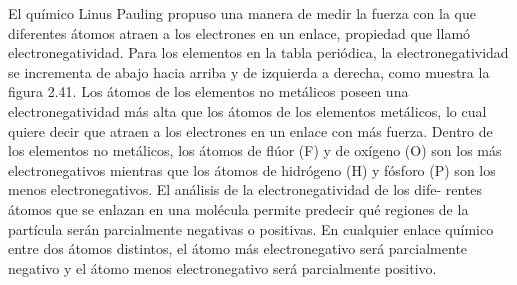\documentclass[12pt,addpoints,answers]{guia}
\begin{document}
\begin{tcolorbox}[enhanced,attach boxed title to top center={yshift=-3mm,yshifttext=-1mm},
        colback=blue!5!white,colframe=blue!75!black,colbacktitle=red!80!black,
        title=Electronegatividad,fonttitle=\bfseries,
        boxed title style={size=small,colframe=red!50!black} ]
    El químico Linus Pauling propuso una manera de medir la fuerza con la que diferentes
    átomos atraen a los electrones en un enlace, propiedad que llamó electronegatividad.
    Para los elementos en la
    tabla periódica, la electronegatividad se incrementa
    de abajo hacia arriba y de izquierda a derecha, como
    muestra la figura 2.41.
    Los átomos de los elementos no metálicos poseen una electronegatividad más
    alta que los átomos de los elementos metálicos, lo cual quiere decir que atraen a los electrones en un enlace con
    más fuerza. Dentro de los elementos no metálicos, los átomos de flúor (F) y de oxígeno
    (O) son los más electronegativos mientras que los átomos de hidrógeno (H) y fósforo
    (P) son los menos electronegativos. El análisis de la electronegatividad de los dife-
    rentes átomos que se enlazan en una molécula permite predecir qué regiones de la
    partícula serán parcialmente negativas o positivas. En cualquier enlace químico entre
    dos átomos distintos, el átomo más electronegativo será parcialmente negativo y el
    átomo menos electronegativo será parcialmente positivo.
\end{tcolorbox}
\end{document}
